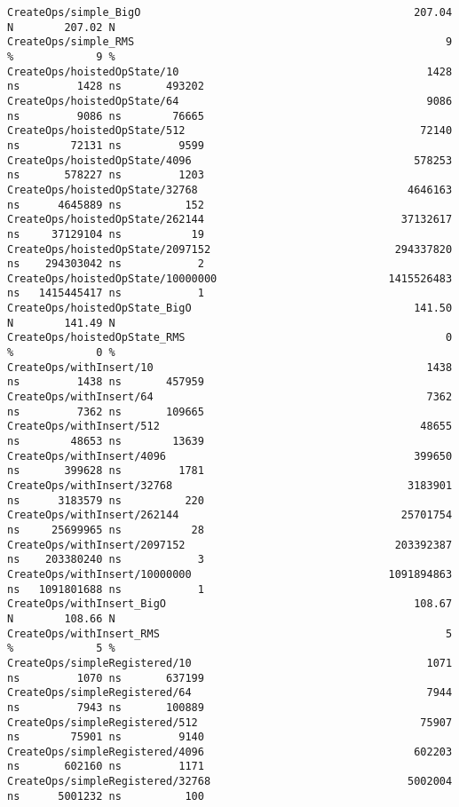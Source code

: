 \begin{code}
\begin{verbatim}
CreateOps/simple_BigO                                           207.04 N        207.02 N
CreateOps/simple_RMS                                                 9 %             9 %
CreateOps/hoistedOpState/10                                       1428 ns         1428 ns       493202
CreateOps/hoistedOpState/64                                       9086 ns         9086 ns        76665
CreateOps/hoistedOpState/512                                     72140 ns        72131 ns         9599
CreateOps/hoistedOpState/4096                                   578253 ns       578227 ns         1203
CreateOps/hoistedOpState/32768                                 4646163 ns      4645889 ns          152
CreateOps/hoistedOpState/262144                               37132617 ns     37129104 ns           19
CreateOps/hoistedOpState/2097152                             294337820 ns    294303042 ns            2
CreateOps/hoistedOpState/10000000                           1415526483 ns   1415445417 ns            1
CreateOps/hoistedOpState_BigO                                   141.50 N        141.49 N
CreateOps/hoistedOpState_RMS                                         0 %             0 %
CreateOps/withInsert/10                                           1438 ns         1438 ns       457959
CreateOps/withInsert/64                                           7362 ns         7362 ns       109665
CreateOps/withInsert/512                                         48655 ns        48653 ns        13639
CreateOps/withInsert/4096                                       399650 ns       399628 ns         1781
CreateOps/withInsert/32768                                     3183901 ns      3183579 ns          220
CreateOps/withInsert/262144                                   25701754 ns     25699965 ns           28
CreateOps/withInsert/2097152                                 203392387 ns    203380240 ns            3
CreateOps/withInsert/10000000                               1091894863 ns   1091801688 ns            1
CreateOps/withInsert_BigO                                       108.67 N        108.66 N
CreateOps/withInsert_RMS                                             5 %             5 %
CreateOps/simpleRegistered/10                                     1071 ns         1070 ns       637199
CreateOps/simpleRegistered/64                                     7944 ns         7943 ns       100889
CreateOps/simpleRegistered/512                                   75907 ns        75901 ns         9140
CreateOps/simpleRegistered/4096                                 602203 ns       602160 ns         1171
CreateOps/simpleRegistered/32768                               5002004 ns      5001232 ns          100

\end{verbatim}
\end{code}
